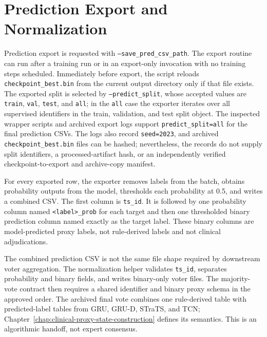 \section{Prediction Export and Normalization}
\label{sec:predictive-modeling-proxy-states:prediction-export-normalization}

Prediction export is requested with \texttt{--save\_pred\_csv\_path}.  The export routine can run after a training run or in an export-only invocation with no training steps scheduled.  Immediately before export, the script reloads \texttt{checkpoint\_best.bin} from the current output directory only if that file exists.  The exported split is selected by \texttt{--predict\_split}, whose accepted values are \texttt{train}, \texttt{val}, \texttt{test}, and \texttt{all}; in the \texttt{all} case the exporter iterates over all supervised identifiers in the train, validation, and test split object.  The inspected wrapper scripts and archived export logs support \texttt{predict\_split=all} for the final prediction CSVs.  The logs also record \texttt{seed=2023}, and archived \texttt{checkpoint\_best.bin} files can be hashed; nevertheless, the records do not supply split identifiers, a processed-artifact hash, or an independently verified checkpoint-to-export and archive-copy manifest.

For every exported row, the exporter removes labels from the batch, obtains probability outputs from the model, thresholds each probability at 0.5, and writes a combined CSV.  The first column is \texttt{ts\_id}.  It is followed by one probability column named \texttt{<label>\_prob} for each target and then one thresholded binary prediction column named exactly as the target label.  These binary columns are model-predicted proxy labels, not rule-derived labels and not clinical adjudications.

The combined prediction CSV is not the same file shape required by downstream voter aggregation.  The normalization helper validates \texttt{ts\_id}, separates probability and binary fields, and writes binary-only voter files.  The majority-vote contract then requires a shared identifier and binary proxy schema in the approved order.  The archived final vote combines one rule-derived table with predicted-label tables from GRU, GRU-D, STraTS, and TCN; Chapter~\ref{chap:clinical-proxy-state-construction} defines its semantics.  This is an algorithmic handoff, not expert consensus.
